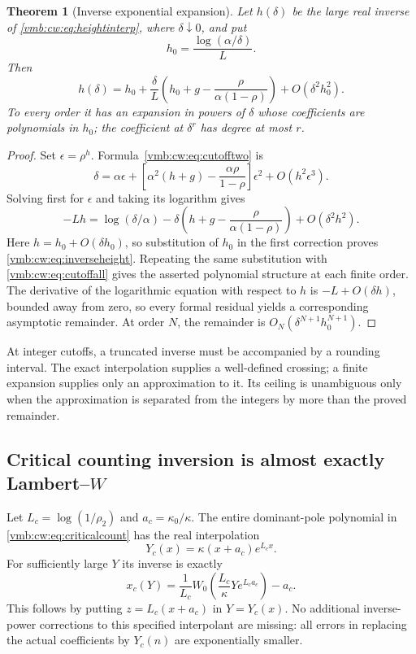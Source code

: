 \documentclass[11pt,a4paper]{article}
\numberwithin{equation}{section}
\newtheorem{theorem}{Theorem}[section]
\theoremstyle{definition}\newtheorem{definition}[theorem]{Definition}
\theoremstyle{remark}\newtheorem{remark}[theorem]{Remark}
\begin{document}
\begin{theorem}[Inverse exponential expansion]\label{vmb:cw:thm:inverseheight}
Let $h(\delta)$ be the large real inverse of \eqref{vmb:cw:eq:heightinterp},
where $\delta\downarrow0$, and put
\begin{equation}\label{vmb:cw:eq:h0}
 h_0=\frac{\log(\alpha/\delta)}L.
\end{equation}
Then
\begin{equation}\label{vmb:cw:eq:inverseheight}
 \boxed{\displaystyle
 h(\delta)=h_0+\frac\delta L
 \left(h_0+g-\frac{\rho}{\alpha(1-\rho)}\right)
 +O(\delta^2h_0^2).}
\end{equation}
To every order it has an expansion in powers of $\delta$ whose coefficients
are polynomials in $h_0$; the coefficient at $\delta^r$ has degree at most
$r$.
\end{theorem}
\begin{proof}
Set $\epsilon=\rho^h$. Formula~\eqref{vmb:cw:eq:cutofftwo} is
\[
 \delta=\alpha\epsilon+
 \left[\alpha^2(h+g)-\frac{\alpha\rho}{1-\rho}\right]\epsilon^2
 +O(h^2\epsilon^3).
\]
Solving first for $\epsilon$ and taking its logarithm gives
\[
 -Lh=\log(\delta/\alpha)
 -\delta\left(h+g-\frac{\rho}{\alpha(1-\rho)}\right)
 +O(\delta^2h^2).
\]
Here $h=h_0+O(\delta h_0)$, so substitution of $h_0$ in the first correction
proves \eqref{vmb:cw:eq:inverseheight}. Repeating the same substitution with
\eqref{vmb:cw:eq:cutoffall} gives the asserted polynomial structure at each finite
order. The derivative of the logarithmic equation with respect to $h$ is
$-L+O(\delta h)$, bounded away from zero, so every formal residual yields
a corresponding asymptotic remainder. At order $N$, the remainder is
$O_N(\delta^{N+1}h_0^{N+1})$.
\end{proof}

At integer cutoffs, a truncated inverse must be accompanied by a rounding
interval. The exact interpolation supplies a well-defined crossing; a
finite expansion supplies only an approximation to it. Its ceiling is
unambiguous only when the approximation is separated from the integers by
more than the proved remainder.

\subsection{Critical counting inversion is almost exactly Lambert--\texorpdfstring{$W$}{W}}
Let $L_c=\log(1/\rho_2)$ and $a_c=\kappa_0/\kappa$. The entire dominant-pole
polynomial in \eqref{vmb:cw:eq:criticalcount} has the real interpolation
\[
 Y_c(x)=\kappa(x+a_c)e^{L_cx}.
\]
For sufficiently large $Y$ its inverse is exactly
\begin{equation}\label{vmb:cw:eq:Wcrit}
 \boxed{\displaystyle
 x_c(Y)=\frac1{L_c}W_0\left(\frac{L_c}{\kappa}Ye^{L_ca_c}\right)-a_c.}
\end{equation}
This follows by putting $z=L_c(x+a_c)$ in $Y=Y_c(x)$. No additional
inverse-power corrections to this specified interpolant are missing:
all errors in replacing the actual coefficients by $Y_c(n)$ are
exponentially smaller.
\end{document}
